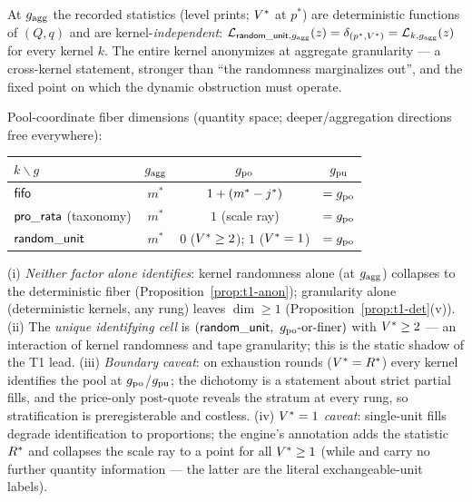 
\begin{proposition}
\label{prop:t1-anon}
At $g_{\mathrm{agg}}$ the recorded statistics (level prints; $V^{*}$ at $p^{*}$) are
deterministic functions of $(Q, q)$ and are kernel-\emph{independent}:
$\mathcal{L}_{\mathsf{random\_unit},g_{\mathrm{agg}}}(z) = \delta_{(p^{*},V^{*})} =
\mathcal{L}_{k,g_{\mathrm{agg}}}(z)$ for every kernel $k$. The entire kernel
anonymizes at aggregate granularity --- a cross-kernel statement, stronger
than ``the randomness marginalizes out'', and the fixed point on which the
dynamic obstruction must operate.
\end{proposition}


\begin{corollary}
\label{cor:t1-grid}
Pool-coordinate fiber dimensions (quantity space; deeper/aggregation
directions free everywhere):
\begin{center}
\begin{tabular}{@{}lccc@{}}
\toprule
$k \backslash g$ & $g_{\mathrm{agg}}$ & $g_{\mathrm{po}}$ & $g_{\mathrm{pu}}$ \\
\midrule
$\mathsf{fifo}$ & $m^{*}$ & $1 + (m^{*} - j^{*})$ & $= g_{\mathrm{po}}$ \\
$\mathsf{pro\_rata}$ (taxonomy) & $m^{*}$ & $1$ (scale ray) & $= g_{\mathrm{po}}$ \\
$\mathsf{random\_unit}$ & $m^{*}$ & $0$ ($V^{*} \geq 2$); $1$ ($V^{*} = 1$) & $= g_{\mathrm{po}}$ \\
\bottomrule
\end{tabular}
\end{center}
(i) \emph{Neither factor alone identifies}: kernel randomness alone (at
$g_{\mathrm{agg}}$) collapses to the deterministic fiber (Proposition~\ref{prop:t1-anon});
granularity alone (deterministic kernels, any rung) leaves $\dim \geq 1$
(Proposition~\ref{prop:t1-det}(v)). (ii) The \emph{unique identifying cell}
is $(\kru,\ \gpo\text{-or-finer})$ with $V^{*} \geq 2$ --- an interaction of
kernel randomness and tape granularity; this is the static shadow of the T1
lead. (iii) \emph{Boundary caveat}: on exhaustion rounds ($V^{*} = R^{*}$)
every kernel identifies the pool at $g_{\mathrm{po}}$/$g_{\mathrm{pu}}$; the dichotomy is a
statement about strict partial fills, and the price-only post-quote reveals
the stratum at every rung, so stratification is preregisterable and
costless. (iv) \emph{$V^{*} = 1$ caveat}: single-unit fills degrade
identification to proportions; the engine's  annotation
adds the statistic $R^{*}$ and collapses the scale ray to a point for all
$V^{*} \geq 1$ (while  and  carry
no further quantity information --- the latter are the literal
exchangeable-unit labels).
\end{corollary}

